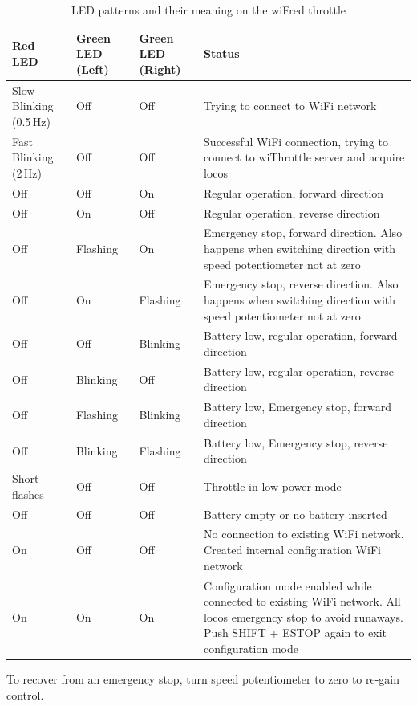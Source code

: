 \documentclass[11pt,a4paper]{scrartcl}
\begin{document}
\begin{table}
  \caption{LED patterns and their meaning on the wiFred throttle} \label{ledTable}

  \vspace{0.5em}

  \centering
  \begin{tabular}{| m{6em} | m{6em} | m{6em} | m{15em} |}
    \hline
    Red LED & Green LED (Left) & Green LED (Right) & Status \\
    \hline
    \hline
    Slow Blinking (0.5\,Hz) & Off & Off & Trying to connect to WiFi network \\
    \hline
    Fast Blinking (2\,Hz) & Off & Off & Successful WiFi connection, trying to connect to wiThrottle server and acquire locos \\
    \hline
    \hline
    Off & Off & On & Regular operation, forward direction \\
    \hline
    Off & On & Off & Regular operation, reverse direction \\
    \hline
    Off & Flashing & On & Emergency stop, forward direction. Also happens when switching direction with speed potentiometer not at zero \\
    \hline
    Off & On & Flashing & Emergency stop, reverse direction. Also happens when switching direction with speed potentiometer not at zero \\
    \hline
    \hline
    Off & Off & Blinking & Battery low, regular operation, forward direction \\
    \hline
    Off & Blinking & Off & Battery low, regular operation, reverse direction \\
    \hline
    Off & Flashing & Blinking & Battery low, Emergency stop, forward direction \\
    \hline
    Off & Blinking & Flashing & Battery low, Emergency stop, reverse direction \\
    \hline
    Short flashes & Off & Off & Throttle in low-power mode \\
    \hline
    Off & Off & Off & Battery empty or no battery inserted \\
    \hline
    \hline
    On & Off & Off & No connection to existing WiFi network. Created internal configuration WiFi network \\
    \hline
    On & On & On & Configuration mode enabled while connected to existing WiFi network. All locos emergency stop to avoid runaways. Push SHIFT + ESTOP again to exit configuration mode \\
    \hline
    
  \end{tabular}

  \vspace{0.5em}

  To recover from an emergency stop, turn speed potentiometer to zero to re-gain control.
  
\end{table}
\end{document}
